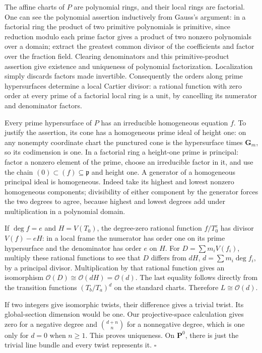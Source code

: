 \documentclass[11pt]{article}
\begin{document}
The affine charts of \(P\) are polynomial rings, and their local rings
are factorial. One can see the polynomial assertion inductively from
Gauss's argument: in a factorial ring the product of two primitive
polynomials is primitive, since reduction modulo each prime factor gives
a product of two nonzero polynomials over a domain; extract the greatest
common divisor of the coefficients and factor over the fraction field.
Clearing denominators and this primitive-product assertion give
existence and uniqueness of polynomial factorization. Localization
simply discards factors made invertible. Consequently the orders along
prime hypersurfaces determine a local Cartier divisor: a rational
function with zero order at every prime of a factorial local ring is a
unit, by cancelling its numerator and denominator factors.

Every prime hypersurface of \(P\) has an irreducible homogeneous
equation \(f\). To justify the assertion, its cone has a homogeneous
prime ideal of height one: on any nonempty coordinate chart the
punctured cone is the hypersurface times \(\mathbf G_m\), so its
codimension is one. In a factorial ring a height-one prime is principal:
factor a nonzero element of the prime, choose an irreducible factor in
it, and use the chain \((0)\subset(f)\subseteq\mathfrak p\) and height
one. A generator of a homogeneous principal ideal is homogeneous. Indeed
take its highest and lowest nonzero homogeneous components; divisibility
of either component by the generator forces the two degrees to agree,
because highest and lowest degrees add under multiplication in a
polynomial domain.

If \(\deg f=e\) and \(H=V(T_0)\), the degree-zero rational function
\(f/T_0^e\) has divisor \(V(f)-eH\): in a local frame the numerator has
order one on its prime hypersurface and the denominator has order \(e\)
on \(H\). For \(D=\sum m_iV(f_i)\), multiply these rational functions to
see that \(D\) differs from \(dH\), \(d=\sum m_i\deg f_i\), by a
principal divisor. Multiplication by that rational function gives an
isomorphism \(\mathcal O(D)\cong\mathcal O(dH)=\mathcal O(d)\). The last
equality follows directly from the transition functions \((T_b/T_a)^d\)
on the standard charts. Therefore \(L\cong\mathcal O(d)\).

If two integers give isomorphic twists, their difference gives a trivial
twist. Its global-section dimension would be one. Our projective-space
calculation gives zero for a negative degree and \(\binom{d+n}{n}\) for
a nonnegative degree, which is one only for \(d=0\) when \(n\geq1\).
This proves uniqueness. On \(\mathbf P^0\), there is just the trivial
line bundle and every twist represents it. \(\square\)
\end{document}

